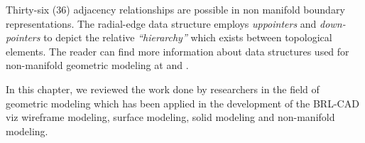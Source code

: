 \hspace{30} Thirty­-six   (36)   adjacency   relationships   are   possible   in   non­ manifold   boundary  
representations.   The   radial-­edge   data   structure   employs   \textit{up­pointers}   and  
\textit{down­pointers}   to   depict   the   relative   \textit{“hierarchy”}   which   exists   between   topological  
elements.   The   reader   can   find   more   information   about   data   structures   used   for  
non-­manifold geometric modeling at \cite{31} and \cite{32}. 
 
\hspace{30} In this chapter, we reviewed the work done by researchers in the field of  
geometric modeling which has been applied in the development of the BRL-­CAD viz 
wireframe modeling, surface modeling, solid modeling and non-­manifold modeling.  

\clearpage
